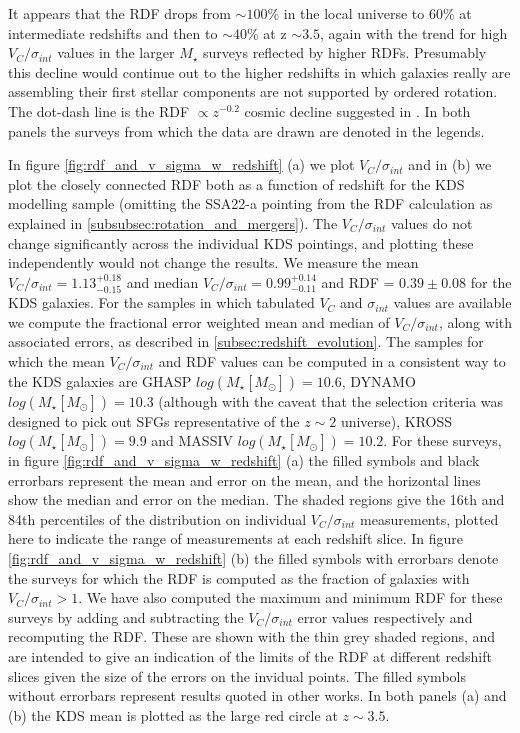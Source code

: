 \documentclass[fleqn,usenatbib]{mn2e}
\begin{document}
\begin{figure*}
{    It appears that the RDF drops from $\sim 100\%$ in the local universe to $60\%$ at intermediate redshifts and then to $\sim 40\%$ at z $\sim 3.5$, again with the trend for high $V_{C}/\sigma_{int}$ values in the larger $M_{\star}$ surveys reflected by higher RDFs.
    Presumably this decline would continue out to the higher redshifts in which galaxies really are assembling their first stellar components are not supported by ordered rotation.
    The dot-dash line is the RDF $\propto z^{-0.2}$ cosmic decline suggested in \protect\cite{Stott2016}.
    In both panels the surveys from which the data are drawn are denoted in the legends.
}
    \label{fig:rdf_and_v_sigma_w_redshift}
\end{figure*}

In figure \ref{fig:rdf_and_v_sigma_w_redshift} (a) we plot $V_{C}/\sigma_{int}$ and in (b) we plot the closely connected RDF both as a function of redshift for the KDS modelling sample (omitting the SSA22-a pointing from the RDF calculation as explained in \cref{subsubsec:rotation_and_mergers}).
The $V_{C}/\sigma_{int}$ values do not change significantly across the individual KDS pointings, and plotting these independently would not change the results.
We measure the mean $V_{C}/\sigma_{int} = 1.13^{+0.18}_{-0.15}$ and median $V_{C}/\sigma_{int} = 0.99^{+0.14}_{-0.11}$ and RDF = $0.39 \pm 0.08$ for the KDS galaxies.
For the samples in which tabulated $V_{C}$ and $\sigma_{int}$ values are available we compute the fractional error weighted mean and median of $V_{C}/\sigma_{int}$, along with associated errors, as described in \cref{subsec:redshift_evolution}.
The samples for which the mean $V_{C}/\sigma_{int}$ and RDF values can be computed in a consistent way to the KDS galaxies are GHASP \citep[E08]{Epinat2008} $log(M_{\star}[M_{\odot}])=10.6$, DYNAMO \citep[G14]{Green2014} $log(M_{\star}[M_{\odot}])=10.3$ (although with the caveat that the selection criteria was designed to pick out SFGs representative of the $z\sim2$ universe), KROSS \citep[H17]{Harrison2017} $log(M_{\star}[M_{\odot}])=9.9$ and MASSIV \citep[E12]{Epinat2012} $log(M_{\star}[M_{\odot}])=10.2$.
For these surveys, in figure \ref{fig:rdf_and_v_sigma_w_redshift} (a) the filled symbols and black errorbars represent the mean and error on the mean, and the horizontal lines show the median and error on the median.   
The shaded regions give the 16th and 84th percentiles of the distribution on individual $V_{C}/\sigma_{int}$ measurements, plotted here to indicate the range of measurements at each redshift slice.
In figure \ref{fig:rdf_and_v_sigma_w_redshift} (b) the filled symbols with errorbars denote the surveys for which the RDF is computed as the fraction of galaxies with $V_{C}/\sigma_{int} > 1$.
We have also computed the maximum and minimum RDF for these surveys by adding and subtracting the $V_{C}/\sigma_{int}$ error values respectively and recomputing the RDF.
These are shown with the thin grey shaded regions, and are intended to give an indication of the limits of the RDF at different redshift slices given the size of the errors on the invidual points.
The filled symbols without errorbars represent results quoted in other works.
In both panels (a) and (b) the KDS mean is plotted as the large red circle at $z\sim3.5$.
\end{document}
